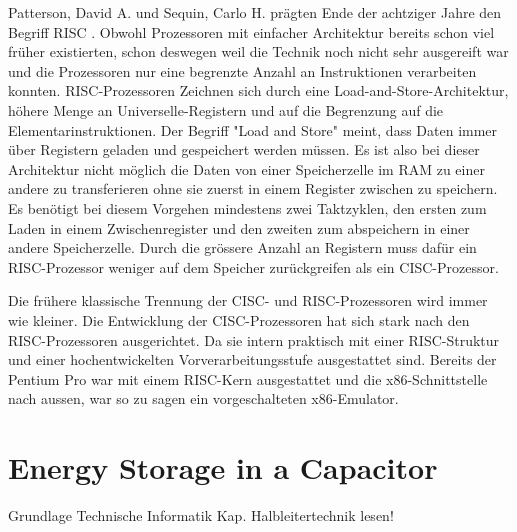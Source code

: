 Patterson, David A. und Sequin, Carlo H. prägten Ende der achtziger Jahre den Begriff RISC \cite{Patterson:1981:RIR:800052.801895}. Obwohl Prozessoren mit einfacher Architektur bereits schon viel früher existierten, schon deswegen weil die Technik noch nicht sehr ausgereift war und die Prozessoren nur eine begrenzte Anzahl an Instruktionen verarbeiten konnten. RISC-Prozessoren Zeichnen sich durch eine Load-and-Store-Architektur, höhere Menge an Universelle-Registern und auf die Begrenzung auf die Elementarinstruktionen. Der Begriff "Load and Store" meint, dass Daten immer über Registern geladen und gespeichert werden müssen. Es ist also bei dieser Architektur nicht möglich die Daten von einer Speicherzelle im RAM zu einer andere zu transferieren ohne sie zuerst in einem Register zwischen zu speichern. Es benötigt bei diesem Vorgehen mindestens zwei Taktzyklen, den ersten zum Laden in einem Zwischenregister und den zweiten zum abspeichern in einer andere Speicherzelle. Durch die grössere Anzahl an Registern muss dafür ein RISC-Prozessor weniger auf dem Speicher zurückgreifen als ein CISC-Prozessor.
\par
Die frühere klassische Trennung der CISC- und RISC-Prozessoren wird immer wie kleiner. Die Entwicklung der CISC-Prozessoren hat sich stark nach den RISC-Prozessoren ausgerichtet. Da sie intern praktisch mit einer RISC-Struktur und einer hochentwickelten Vorverarbeitungsstufe ausgestattet sind. Bereits der Pentium Pro war mit einem RISC-Kern ausgestattet und die x86-Schnittstelle nach aussen, war so zu sagen ein vorgeschalteten x86-Emulator.







\section{Energy Storage in a Capacitor}


Grundlage Technische Informatik Kap. Halbleitertechnik lesen!
